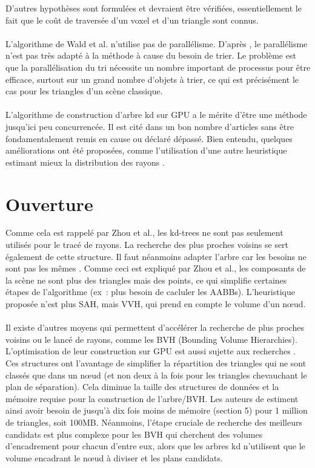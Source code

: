 \documentclass[a4paper]{article}
\begin{document}
D'autres hypothèses sont formulées et devraient être vérifiées, essentiellement le fait que le coût de traversée d'un voxel et d'un triangle sont connus.
\\\\
L'algorithme de Wald et al. n'utilise pas de parallélisme. D'après \cite{parallel-cpu}, le parallélisme n'est pas très adapté à la méthode à cause du besoin de trier. Le problème est que la parallélisation du tri nécessite un nombre important de processus pour être efficace, surtout sur un grand nombre d'objets à trier, ce qui est précisément le cas pour les triangles d'un scène classique.
\\\\
L'algorithme de construction d'arbre kd sur GPU a le mérite d'être une méthode jusqu'ici peu concurrencée. Il est cité dans un bon nombre d'articles sans être fondamentalement remis en cause ou déclaré dépassé. Bien entendu, quelques améliorations ont été proposées, comme l'utilisation d'une autre heuristique estimant mieux la distribution des rayons \cite{anti-sah}.

\section{Ouverture}
Comme cela est rappelé par Zhou et al., les kd-trees ne sont pas seulement utilisés pour le tracé de rayons. La recherche des plus proches voisins se sert également de cette structure. Il faut néanmoins adapter l'arbre  car les besoins ne sont pas les mêmes \cite{buffered-kdtree}. Comme ceci est expliqué par Zhou et al., les composants de la scène ne sont plus des triangles mais des points, ce qui simplifie certaines étapes de l'algorithme (ex~: plus besoin de cacluler les AABBs). L'heuristique proposée n'est plus SAH, mais VVH, qui prend en compte le volume d'un nœud.
\\\\
Il existe d'autres moyens qui permettent d'accélérer la recherche de plus proches voisins ou le lancé de rayons, comme les BVH (Bounding Volume Hierarchies). L'optimisation de leur construction sur GPU est aussi sujette aux recherches \cite{bvh}. Ces structures ont l'avantage de simplifier la répartition des triangles qui ne sont classés que dans un nœud (et non deux à la fois pour les triangles chevauchant le plan de séparation). Cela diminue la taille des structures de données et la mémoire requise pour la construction de l'arbre/BVH. Les auteurs de \cite{bvh} estiment ainsi avoir besoin de jusqu'à dix fois moins de mémoire (section 5) pour 1 million de triangles, soit 100MB. Néanmoins, l'étape cruciale de recherche des meilleurs candidats est plus complexe pour les BVH qui cherchent des volumes d'encadrement pour chacun d'entre eux, alors que les arbres kd n'utilisent que le volume encadrant le nœud à diviser et les plans candidats.
\end{document}
